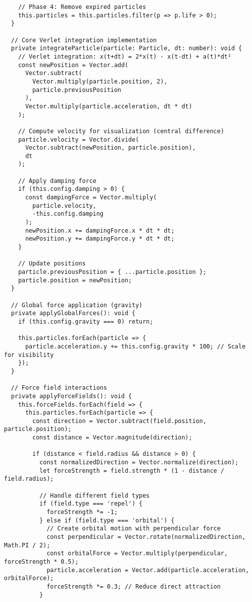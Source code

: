 \documentclass[12pt,journal,onecolumn]{IEEEtran}
\begin{document}
\begin{verbatim}
    // Phase 4: Remove expired particles
    this.particles = this.particles.filter(p => p.life > 0);
  }

  // Core Verlet integration implementation
  private integrateParticle(particle: Particle, dt: number): void {
    // Verlet integration: x(t+dt) = 2*x(t) - x(t-dt) + a(t)*dt²
    const newPosition = Vector.add(
      Vector.subtract(
        Vector.multiply(particle.position, 2),
        particle.previousPosition
      ),
      Vector.multiply(particle.acceleration, dt * dt)
    );

    // Compute velocity for visualization (central difference)
    particle.velocity = Vector.divide(
      Vector.subtract(newPosition, particle.position),
      dt
    );

    // Apply damping force
    if (this.config.damping > 0) {
      const dampingForce = Vector.multiply(
        particle.velocity, 
        -this.config.damping
      );
      newPosition.x += dampingForce.x * dt * dt;
      newPosition.y += dampingForce.y * dt * dt;
    }

    // Update positions
    particle.previousPosition = { ...particle.position };
    particle.position = newPosition;
  }

  // Global force application (gravity)
  private applyGlobalForces(): void {
    if (this.config.gravity === 0) return;

    this.particles.forEach(particle => {
      particle.acceleration.y += this.config.gravity * 100; // Scale for visibility
    });
  }

  // Force field interactions
  private applyForceFields(): void {
    this.forceFields.forEach(field => {
      this.particles.forEach(particle => {
        const direction = Vector.subtract(field.position, particle.position);
        const distance = Vector.magnitude(direction);
        
        if (distance < field.radius && distance > 0) {
          const normalizedDirection = Vector.normalize(direction);
          let forceStrength = field.strength * (1 - distance / field.radius);
          
          // Handle different field types
          if (field.type === 'repel') {
            forceStrength *= -1;
          } else if (field.type === 'orbital') {
            // Create orbital motion with perpendicular force
            const perpendicular = Vector.rotate(normalizedDirection, Math.PI / 2);
            const orbitalForce = Vector.multiply(perpendicular, forceStrength * 0.5);
            particle.acceleration = Vector.add(particle.acceleration, orbitalForce);
            forceStrength *= 0.3; // Reduce direct attraction
          }
          

\end{verbatim}
\end{document}
